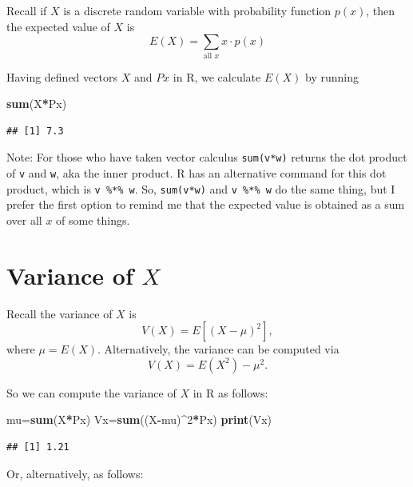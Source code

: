 \documentclass[
]{book}
\newenvironment{Shaded}{\begin{snugshade}}{\end{snugshade}}
\newcommand{\DecValTok}[1]{\textcolor[rgb]{0.00,0.00,0.81}{#1}}
\newcommand{\FunctionTok}[1]{\textcolor[rgb]{0.13,0.29,0.53}{\textbf{#1}}}
\newcommand{\NormalTok}[1]{#1}
\newcommand{\OtherTok}[1]{\textcolor[rgb]{0.56,0.35,0.01}{#1}}
\newcommand{\SpecialCharTok}[1]{\textcolor[rgb]{0.81,0.36,0.00}{\textbf{#1}}}
\theoremstyle{definition}
\theoremstyle{definition}
\theoremstyle{definition}
\theoremstyle{definition}
\theoremstyle{remark}
\begin{document}
Recall if \(X\) is a discrete random variable with probability function \(p(x)\), then the expected value of \(X\) is \[E(X)=\sum_{\text{all }x}x\cdot p(x)\]

Having defined vectors \(X\) and \(Px\) in R, we calculate \(E(X)\) by running

\begin{Shaded}
\begin{Highlighting}[]
\FunctionTok{sum}\NormalTok{(X}\SpecialCharTok{*}\NormalTok{Px) }
\end{Highlighting}
\end{Shaded}

\begin{verbatim}
## [1] 7.3
\end{verbatim}

Note: For those who have taken vector calculus \texttt{sum(v*w)} returns the dot product of \texttt{v} and \texttt{w}, aka the inner product. R has an alternative command for this dot product, which is \texttt{v\ \%*\%\ w}. So, \texttt{sum(v*w)} and \texttt{v\ \%*\%\ w} do the same thing, but I prefer the first option to remind me that the expected value is obtained as a sum over all \(x\) of some things.

\section{\texorpdfstring{Variance of \(X\)}{Variance of X}}\label{variance-of-x}

Recall the variance of \(X\) is \[V(X) = E[(X-\mu)^2],\] where \(\mu = E(X)\).
Alternatively, the variance can be computed via
\[V(X) = E(X^2)-\mu^2.\]

So we can compute the variance of \(X\) in R as follows:

\begin{Shaded}
\begin{Highlighting}[]
\NormalTok{mu}\OtherTok{=}\FunctionTok{sum}\NormalTok{(X}\SpecialCharTok{*}\NormalTok{Px) }
\NormalTok{Vx}\OtherTok{=}\FunctionTok{sum}\NormalTok{((X}\SpecialCharTok{{-}}\NormalTok{mu)}\SpecialCharTok{\^{}}\DecValTok{2}\SpecialCharTok{*}\NormalTok{Px)}
\FunctionTok{print}\NormalTok{(Vx)}
\end{Highlighting}
\end{Shaded}

\begin{verbatim}
## [1] 1.21
\end{verbatim}

Or, alternatively, as follows:
\end{document}
